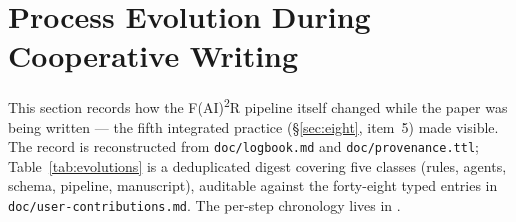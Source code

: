 \section{Process Evolution During Cooperative Writing}
\label{sec:evolution}

This section records how the F(AI)\textsuperscript{2}R pipeline
itself changed while the paper was being written --- the fifth
integrated practice (\S\ref{sec:eight}, item~5) made visible. The
record is reconstructed from \texttt{doc/logbook.md} and
\texttt{doc/provenance.ttl}; Table~\ref{tab:evolutions} is a
deduplicated digest covering five classes (rules, agents, schema,
pipeline, manuscript), auditable against the forty-eight typed
entries in \texttt{doc/user-contributions.md}. The per-step
chronology lives in
.

